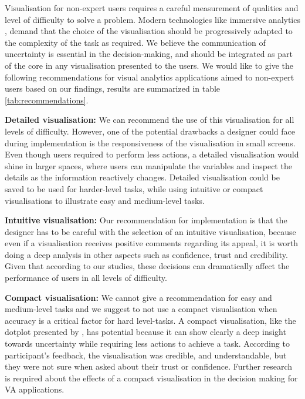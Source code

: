 \documentclass[final,5p,times,twocolumn,authoryear]{elsarticle}
\begin{document}
Visualisation for non-expert users requires a careful measurement of qualities and level of difficulty to solve a problem. Modern technologies like immersive analytics \citep{Bonada2016}, demand that the choice of the visualisation should be progressively adapted to the complexity of the task as required. We believe  the communication of uncertainty is essential in the decision-making, and should be integrated as part of the core in any visualisation presented to the users. We would like to give the following recommendations for visual analytics applications aimed to non-expert users based on our findings, results are summarized in table \ref{tab:recommendations}.

\textbf{Detailed  visualisation:} We can recommend the use of this visualisation for all levels of difficulty. However, one of the potential drawbacks a designer could face during implementation is the responsiveness of the visualisation in small screens. Even though users required to perform less actions, a detailed visualisation would shine in larger spaces, where users can manipulate the variables and inspect the details as the information reactively changes. Detailed visualisation could be saved to be used for harder-level tasks, while using intuitive or compact visualisations to illustrate easy and medium-level tasks.

\textbf{Intuitive visualisation:} Our recommendation for implementation is that the designer has to be careful with the selection of an intuitive visualisation, because even if a visualisation receives positive comments regarding its appeal, it is worth doing a deep analysis in other aspects such as confidence, trust and credibility. Given that according to our studies, these decisions can dramatically affect the performance of users in all levels of difficulty.

\textbf{Compact visualisation:} We cannot give a recommendation for easy and medium-level tasks and we suggest to not use a compact visualisation when accuracy is a critical factor for hard level-tasks. A compact visualisation, like the dotplot presented by \citep{kay_when_2016}, has potential because it can show clearly a deep insight towards uncertainty while requiring less actions to achieve a task. According to participant's feedback, the visualisation was credible, and understandable, but they were not sure when asked about their trust or confidence. Further research is required about the effects of a compact visualisation in the decision making for VA applications.
\end{document}
